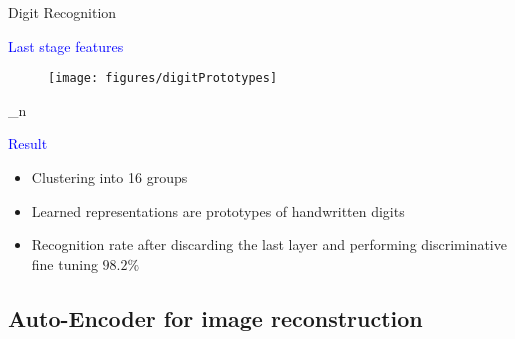 	
	\begin{frame}[t]{Digit Recognition}
			
		\begin{minipage}[t]{0.48\linewidth}
			\textcolor{blue}{\Large Last stage features}
			\begin{figure}
				\texttt{[image: figures/digitPrototypes]}
			\end{figure}
_n \nonumber
		\end{minipage}\hfill			
		\begin{minipage}[t]{0.48\linewidth}
		\textcolor{blue}{\Large Result}
			\begin{itemize}
				\item Clustering into 16 groups
				\item Learned representations are prototypes of handwritten digits			
				\item Recognition rate after discarding the last layer and performing
					discriminative fine tuning $98.2 \%$
			\end{itemize}
		\end{minipage}
	\end{frame}
	
	\subsection{Auto-Encoder for image reconstruction}


